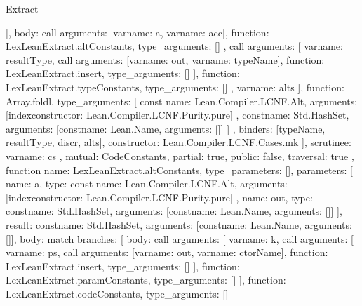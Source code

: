 \begin{lexlean}{Extract}
\begin{toolingmodule}
{{{{{{{                    }
                  ],
                  body: call{
                    arguments: [var{name: a}, var{name: acc}],
                    function: LexLeanExtract.altConstants,
                    type_arguments: []
                  }
                },
                call{
                  arguments: [
                    var{name: resultType},
                    call{
                      arguments: [var{name: out}, var{name: typeName}],
                      function: LexLeanExtract.insert,
                      type_arguments: []
                    }
                  ],
                  function: LexLeanExtract.typeConstants,
                  type_arguments: []
                },
                var{name: alts}
              ],
              function: Array.foldl,
              type_arguments: [
                const{
                  name: Lean.Compiler.LCNF.Alt,
                  arguments: [index{constructor: Lean.Compiler.LCNF.Purity.pure}]
                },
                const{name: Std.HashSet, arguments: [const{name: Lean.Name, arguments: []}]}
              ]
            },
            binders: [typeName, resultType, discr, alts],
            constructor: Lean.Compiler.LCNF.Cases.mk
          }
        ],
        scrutinee: var{name: cs}
      },
      mutual: CodeConstants,
      partial: true,
      public: false,
      traversal: true
    },
    function{
      name: LexLeanExtract.altConstants,
      type_parameters: [],
      parameters: [
        {
          name: a,
          type: const{
            name: Lean.Compiler.LCNF.Alt,
            arguments: [index{constructor: Lean.Compiler.LCNF.Purity.pure}]
          }
        },
        {
          name: out,
          type: const{name: Std.HashSet, arguments: [const{name: Lean.Name, arguments: []}]}
        }
      ],
      result: const{name: Std.HashSet, arguments: [const{name: Lean.Name, arguments: []}]},
      body: match{
        branches: [
          {
            body: call{
              arguments: [
                var{name: k},
                call{
                  arguments: [
                    var{name: ps},
                    call{
                      arguments: [var{name: out}, var{name: ctorName}],
                      function: LexLeanExtract.insert,
                      type_arguments: []
                    }
                  ],
                  function: LexLeanExtract.paramConstants,
                  type_arguments: []
                }
              ],
              function: LexLeanExtract.codeConstants,
              type_arguments: []
}}}}}
\end{toolingmodule}
\end{lexlean}
